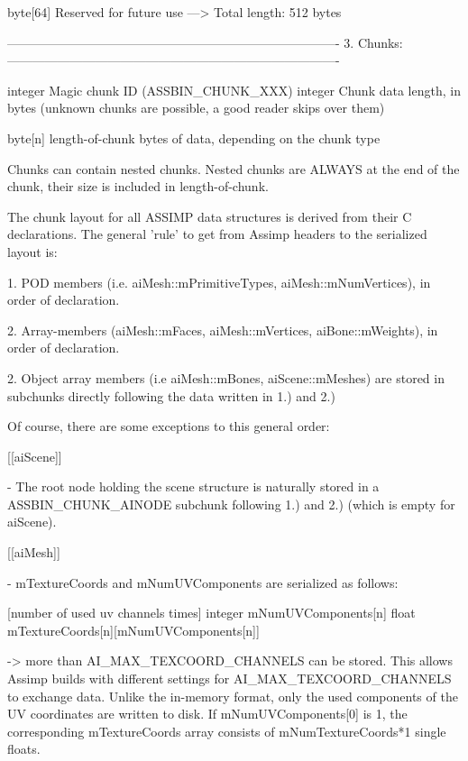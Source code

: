 \begin{DoxyVerb}
byte[64]    Reserved for future use
---> Total length: 512 bytes

-------------------------------------------------------------------------------
3. Chunks:
-------------------------------------------------------------------------------

integer     Magic chunk ID (ASSBIN_CHUNK_XXX)
integer     Chunk data length, in bytes 
                (unknown chunks are possible, a good reader skips over them)

byte[n]     length-of-chunk bytes of data, depending on the chunk type

Chunks can contain nested chunks. Nested chunks are ALWAYS at the end of the chunk,
their size is included in length-of-chunk.

The chunk layout for all ASSIMP data structures is derived from their C declarations.
The general 'rule' to get from Assimp headers to the serialized layout is:

   1. POD members (i.e. aiMesh::mPrimitiveTypes, aiMesh::mNumVertices), 
        in order of declaration.

   2. Array-members (aiMesh::mFaces, aiMesh::mVertices, aiBone::mWeights), 
        in order of declaration.

   2. Object array members (i.e aiMesh::mBones, aiScene::mMeshes) are stored in 
      subchunks directly following the data written in 1.) and 2.)


    Of course, there are some exceptions to this general order:

[[aiScene]]

   - The root node holding the scene structure is naturally stored in
     a ASSBIN_CHUNK_AINODE subchunk following 1.) and 2.) (which is 
     empty for aiScene).

[[aiMesh]]

   - mTextureCoords and mNumUVComponents are serialized as follows:

   [number of used uv channels times]
       integer mNumUVComponents[n]
       float mTextureCoords[n][mNumUVComponents[n]]

       -> more than AI_MAX_TEXCOORD_CHANNELS can be stored. This allows Assimp 
       builds with different settings for AI_MAX_TEXCOORD_CHANNELS to exchange
       data. Unlike the in-memory format, only the used components of the 
       UV coordinates are written to disk. If mNumUVComponents[0] is 1, the
       corresponding mTextureCoords array consists of mNumTextureCoords*1 
       single floats.


\end{DoxyVerb}
